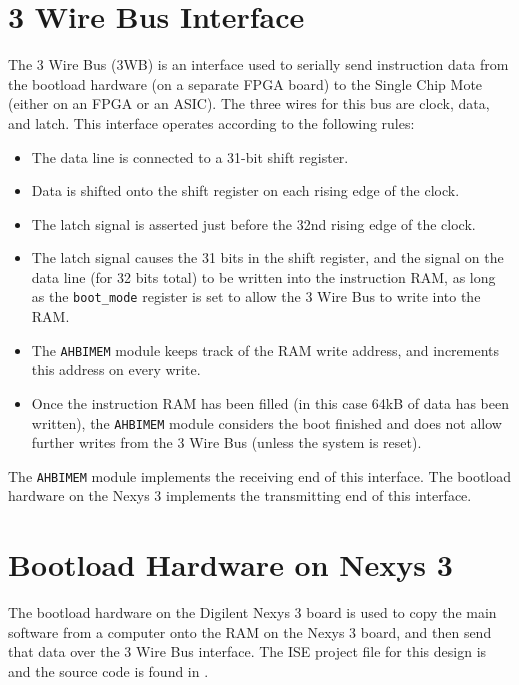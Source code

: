  \section{3 Wire Bus Interface} \label{3wb}
 The 3 Wire Bus (3WB) is an interface used to serially send instruction data from the bootload hardware (on a separate FPGA board) to the Single Chip Mote (either on an FPGA or an ASIC). The three wires for this bus are clock, data, and latch. This interface operates according to the following rules:
 
 \begin{itemize}
 	\item The data line is connected to a 31-bit shift register.
 	\item Data is shifted onto the shift register on each rising edge of the clock.
 	\item The latch signal is asserted just before the 32nd rising edge of the clock.
 	\item The latch signal causes the 31 bits in the shift register, and the signal on the data line (for 32 bits total) to be written into the instruction RAM, as long as the \texttt{boot\_mode} register is set to allow the 3 Wire Bus to write into the RAM.
 	\item The \texttt{AHBIMEM} module keeps track of the RAM write address, and increments this address on every write.
 	\item Once the instruction RAM has been filled (in this case 64kB of data has been written), the \texttt{AHBIMEM} module considers the boot finished and does not allow further writes from the 3 Wire Bus (unless the system is reset).
 \end{itemize}
 
 The \texttt{AHBIMEM} module implements the receiving end of this interface. The bootload hardware on the Nexys 3 implements the transmitting end of this interface.
 
\section{Bootload Hardware on Nexys 3}
The bootload hardware on the Digilent Nexys 3 board is used to copy the main software from a computer onto the RAM on the Nexys 3 board, and then send that data over the 3 Wire Bus interface. The ISE project file for this design is  and the source code is found in .

